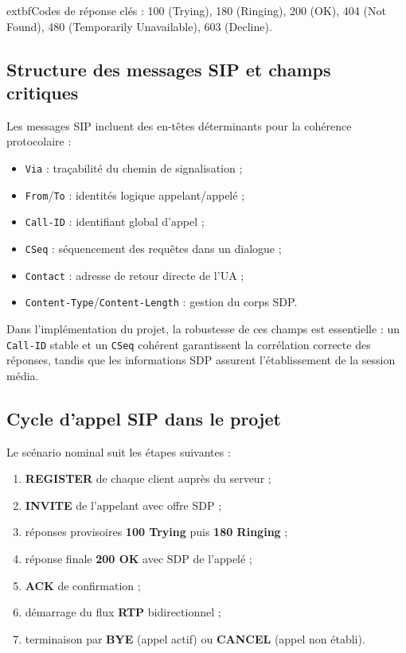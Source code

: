 \documentclass[12pt,a4paper]{article}
\begin{document}
	extbf{Codes de réponse clés :} 100 (Trying), 180 (Ringing), 200 (OK), 404 (Not Found), 480 (Temporarily Unavailable), 603 (Decline).

\subsection{Structure des messages SIP et champs critiques}

Les messages SIP incluent des en-têtes déterminants pour la cohérence protocolaire :
\begin{itemize}[leftmargin=1.2cm]
    \item \texttt{Via} : traçabilité du chemin de signalisation ;
    \item \texttt{From}/\texttt{To} : identités logique appelant/appelé ;
    \item \texttt{Call-ID} : identifiant global d'appel ;
    \item \texttt{CSeq} : séquencement des requêtes dans un dialogue ;
    \item \texttt{Contact} : adresse de retour directe de l'UA ;
    \item \texttt{Content-Type}/\texttt{Content-Length} : gestion du corps SDP.
\end{itemize}

Dans l'implémentation du projet, la robustesse de ces champs est essentielle : un \texttt{Call-ID} stable et un \texttt{CSeq} cohérent garantissent la corrélation correcte des réponses, tandis que les informations SDP assurent l'établissement de la session média.

\subsection{Cycle d'appel SIP dans le projet}

Le scénario nominal suit les étapes suivantes :
\begin{enumerate}[leftmargin=1.2cm]
    \item \textbf{REGISTER} de chaque client auprès du serveur ;
    \item \textbf{INVITE} de l'appelant avec offre SDP ;
    \item réponses provisoires \textbf{100 Trying} puis \textbf{180 Ringing} ;
    \item réponse finale \textbf{200 OK} avec SDP de l'appelé ;
    \item \textbf{ACK} de confirmation ;
    \item démarrage du flux \textbf{RTP} bidirectionnel ;
    \item terminaison par \textbf{BYE} (appel actif) ou \textbf{CANCEL} (appel non établi).
\end{enumerate}
\end{document}

